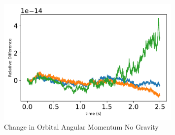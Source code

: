 \begin{figure}[htbp]\centerline{\includegraphics[width=0.8\textwidth]{AutoTeX/ChangeInOrbitalAngularMomentumNoGravity}}\caption{Change in Orbital Angular Momentum No Gravity}\label{fig:ChangeInOrbitalAngularMomentumNoGravity}\end{figure}